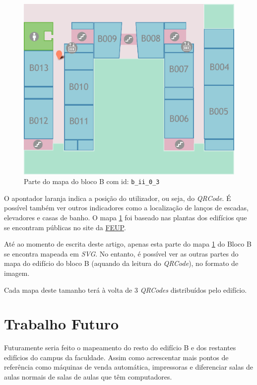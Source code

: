 \documentclass[twocolumn,twoside,11pt]{article}
\newcommand{\svg}{\emph{SVG}}
\newcommand{\qrcode}{\emph{QRCode}}
\newcommand{\qrcodes}{\emph{QRCodes}}
\begin{document}
  \begin{figure}[width=\textwidth]
    \begin{center}
      \includegraphics{map.pdf}
    \end{center}
    \cprotect\caption{Parte do mapa do bloco B com id: \verb+b_ii_0_3+}
    \label{fig:map}
  \end{figure}

  O apontador laranja indica a posição do utilizador, ou seja, do \qrcode.
  É possível também ver outros indicadores como a localização de lanços de escadas, elevadores e casas de banho.
  O mapa \ref{fig:map} foi baseado nas plantas dos edifícios que se encontram públicas no site da \href{http://sigarra.up.pt/feup/pt/instal_geral.edificio_view?pv_id=1407}{FEUP}.

  Até ao momento de escrita deste artigo, apenas esta parte do mapa \ref{fig:map} do Bloco B se encontra mapeada em \svg.
  No entanto, é possível ver as outras partes do mapa do edifício do bloco B (aquando da leitura do \qrcode), no formato de imagem.

  Cada mapa deste tamanho terá à volta de 3 \qrcodes{} distribuídos pelo edifício.


\section{Trabalho Futuro} %
\label{sec:trabalho_futuro}
  Futuramente seria feito o mapeamento do resto do edifício B e dos restantes edifícios do campus da faculdade.
  Assim como acrescentar mais pontos de referência como máquinas de venda automática, impressoras e diferenciar salas de aulas normais de salas de aulas que têm computadores.
\end{document}
